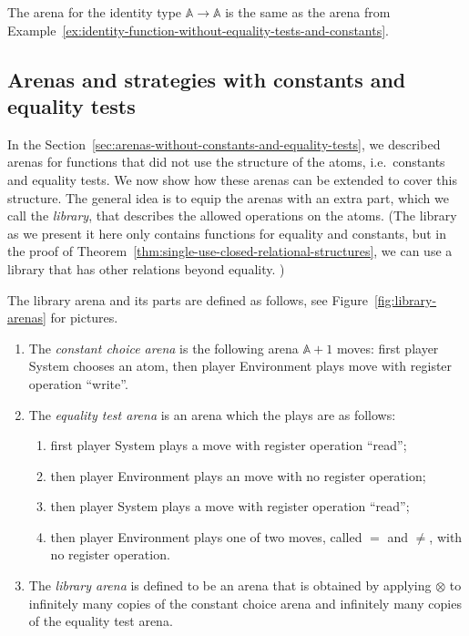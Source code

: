 \documentclass[10pt,a4paper]{amsart}
\numberwithin{equation}{section}
\theoremstyle{plain}
\newcommand{\atoms}{\mathbb A}
\begin{document}
 

\begin{example}
    The arena for the identity type $\atoms \to \atoms$ is the same as the arena from Example~\ref{ex:identity-function-without-equality-tests-and-constants}.
\end{example}





\subsection{Arenas and strategies with constants and equality tests}
\label{sec:arenas-with-constants-and-equality-tests}
In the Section~\ref{sec:arenas-without-constants-and-equality-tests}, we described arenas for functions that did not use the structure of the atoms, i.e.~constants and equality tests. We now show how these arenas can be extended to cover this structure. The general idea is to equip the arenas with an extra part, which we call the \emph{library},  that describes the allowed operations on the atoms. (The library as we present it here only contains functions for equality and constants, but in the proof of Theorem~\ref{thm:single-use-closed-relational-structures}, we can use a library that has other relations beyond equality. )



\begin{definition} \label{def:library-arena} The library arena and its parts are defined as follows, see Figure~\ref{fig:library-arenas} for pictures.
    \begin{enumerate}
        \item The \emph{constant choice arena} is the following arena $\atoms+1$ moves:
        first player System chooses an atom, then player Environment plays move with register operation ``write''. 
        \item The \emph{equality test arena} is an arena which the plays are as follows:
    \begin{enumerate}
        \item first player System plays a move with register operation ``read'';
        \item then player Environment plays an move with no register operation;
        \item then player System plays a move with register operation ``read'';
        \item then player Environment plays one of two moves, called $=$ and $\neq$, with no register operation.
    \end{enumerate}
    \item The \emph{library arena} is defined to be an arena that is obtained by applying $\otimes$ to infinitely many copies of the constant choice arena and infinitely many copies of the  equality test arena.
    \end{enumerate}
\end{definition}
\end{document}
